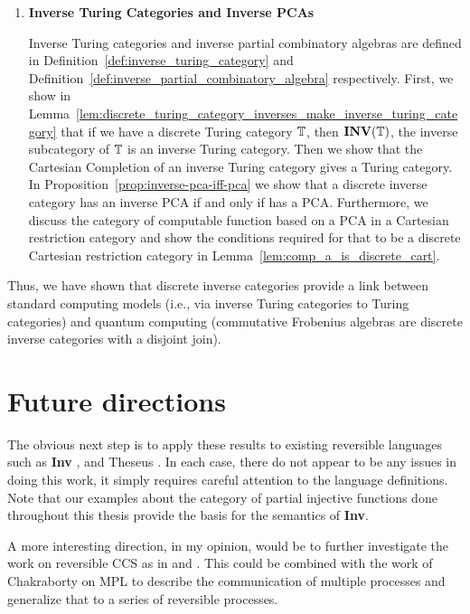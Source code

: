 \begin{enumerate}
\item \textbf{Inverse Turing Categories and Inverse PCAs}

Inverse Turing categories and inverse partial combinatory algebras are defined in
Definition~\ref{def:inverse_turing_category} and
Definition~\ref{def:inverse_partial_combinatory_algebra} respectively. First, we show in
Lemma~\ref{lem:discrete_turing_category_inverses_make_inverse_turing_category} that if we have a
discrete Turing category $\mathbb{T}$, then $\mathbf{INV}({\mathbb{T}})$, the inverse subcategory of $\mathbb{T}$ is an inverse Turing
category. Then we show that the Cartesian Completion of an inverse Turing category gives a Turing
category. In Proposition~\ref{prop:inverse-pca-iff-pca} we show that a discrete inverse category \X
has an inverse PCA if and only if \Xt has a PCA. Furthermore, we discuss the category of computable
function based on a PCA in a Cartesian restriction category and show the conditions required for
that to be a discrete Cartesian restriction category in Lemma~\ref{lem:comp_a_is_discrete_cart}.
\end{enumerate}

Thus, we have shown that discrete inverse categories provide a link between standard computing
models (i.e., via inverse Turing categories to Turing categories) and quantum computing (commutative
Frobenius algebras are discrete inverse categories with a disjoint join).

\section{Future directions}
\label{sec:whither-next}

The obvious next step is to apply these results to existing reversible languages such as
\textbf{Inv} \cite{muetal04:injreversible}, and Theseus
\cite{james2013isomorphic,james2012information}. In each case, there do not appear to be any issues
in doing this work, it simply requires careful attention to the language definitions. Note that our
examples about the category of partial injective functions done throughout this thesis provide the
basis for the semantics of \textbf{Inv}.

A more interesting direction, in my opinion, would be to further investigate the work on reversible
CCS as in \cite{danos2004reversible} and \cite{phillips2006operational}. This could be combined with
the work of Chakraborty on MPL \cite{chakraborty2014} to describe the communication of multiple
processes and generalize that to a series of reversible processes.


